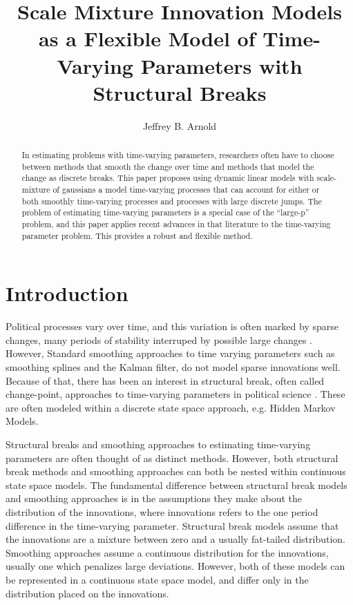 \documentclass{article}
\author{Jeffrey B. Arnold}
\title{Scale Mixture Innovation Models as a Flexible Model of Time-Varying Parameters with Structural Breaks}
\begin{document}
\maketitle{}

\begin{abstract}
  In estimating problems with time-varying parameters, researchers often have to choose between methods that smooth the change over time and methods that model the change as discrete breaks.
  This paper proposes using dynamic linear models with scale-mixture of gaussians a model time-varying processes that can account for either or both smoothly time-varying processes and processes with large discrete jumps.
  The problem of estimating time-varying parameters is a special case of the ``large-p'' problem, and this paper applies recent advances in that literature to the time-varying parameter problem.
  This provides a robust and flexible method. 
\end{abstract}

\section{Introduction}
\label{sec:introduction}

Political processes vary over time, and this variation is often marked by sparse changes, many periods of stability interruped by possible large changes \parencite{RatkovicEng2010}.
However, Standard smoothing approaches to time varying parameters such as smoothing splines and the Kalman filter, do not model sparse innovations well.
Because of that, there has been an interest in structural break, often called change-point, approaches to time-varying parameters in political science \textcite{Park2011}.
These are often modeled within a discrete state space approach, e.g. Hidden Markov Models.

Structural breaks and smoothing approaches to estimating time-varying parameters are often thought of as distinct methods.
However, both structural break methods and smoothing approaches can both be nested within continuous state space models.
The fundamental difference between structural break models and smoothing approaches is in the assumptions they make about the distribution of the innovations, where innovations refers to the one period difference in the time-varying parameter.
Structural break models assume that the innovations are a mixture between zero and a usually fat-tailed distribution.
Smoothing approaches assume a continuous distribution for the innovations, usually one which penalizes large deviations.
However, both of these models can be represented in a continuous state space model, and differ only in the distribution placed on the innovations.
\end{document}
